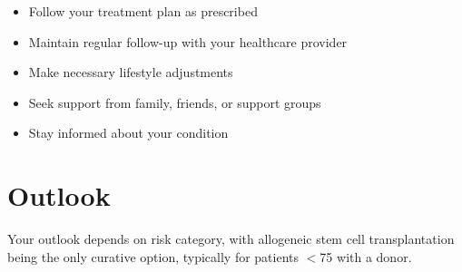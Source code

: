 \begin{itemize}[noitemsep]
  \item Follow your treatment plan as prescribed
  \item Maintain regular follow-up with your healthcare provider
  \item Make necessary lifestyle adjustments
  \item Seek support from family, friends, or support groups
  \item Stay informed about your condition
\end{itemize}
\section{Outlook}
Your outlook depends on risk category, with allogeneic stem cell transplantation being the only curative option, typically for patients $<$75 with a donor.
